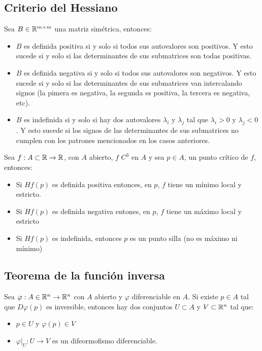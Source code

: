 \subsection{Criterio del Hessiano}
Sea $B\in\mathbb{R}^{m\times m}$ una matriz simétrica, entonces:
\begin{itemize}
\item $B$ es definida positiva si y solo si todos sus autovalores son positivos. Y esto sucede si y solo si las determinantes de sus submatrices son todas positivas.
\item $B$ es definida negativa si y solo si todos sus autovalores son negativos. Y esto sucede si y solo si las determinantes de sus submatrices van intercalando signos (la pimera es negativa, la segunda es positiva, la tercera es negativa, etc).
\item $B$ es indefinida si y solo si hay dos autovalores $\lambda_i$ y $\lambda_j$ tal que $\lambda_i > 0$ y $\lambda_j < 0$. Y esto sucede si los signos de las determinantes de sus submatrices no cumplen con los patrones mencionados en los casos anteriores.
\end{itemize}

Sea $f:A\subset\mathbb{R}\to\mathbb{R}$, con $A$ abierto, $f$ $C^3$ en $A$ y sea $p\in A$, un punto crítico de $f$, entonces:
\begin{itemize}
\item Si $Hf(p)$ es definida positiva entonces, en $p$, $f$ tiene un mínimo local y estricto.
\item Si $Hf(p)$ es definida negativa entones, en $p$, $f$ tiene un máximo local y estricto
\item Si $Hf(p)$ es indefinida, entonces $p$ es un punto silla (no es máximo ni mínimo)
\end{itemize}


\subsection{Teorema de la función inversa}
Sea $\varphi:A\in\mathbb{R}^n\to\mathbb{R}^n$ con $A$ abierto y $\varphi$ diferenciable en $A$. Si existe $p\in A$ tal que $D\varphi(p)$ es inversible, entonces hay dos conjuntos $U\subset A$ y $V\subset\mathbb{R}^n$ tal que:
\begin{itemize}
\item $p\in U$ y $\varphi(p)\in V$
\item $\varphi\big|_U:U\to V$ es un difeormofismo diferenciable.
\end{itemize}

